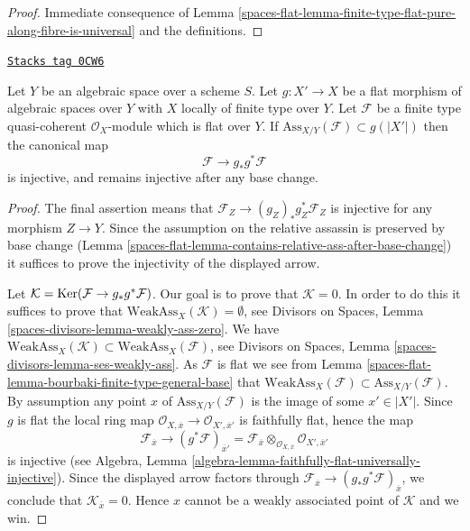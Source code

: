 \begin{proof}
Immediate consequence of
Lemma \ref{spaces-flat-lemma-finite-type-flat-pure-along-fibre-is-universal}
and the definitions.
\end{proof}

\begin{lemma}
\label{spaces-flat-lemma-universally-separating}
\href{https://stacks.math.columbia.edu/tag/0CW6}{\texttt{Stacks tag 0CW6}}

Let $Y$ be an algebraic space over a scheme $S$.
Let $g : X' \to X$ be a flat morphism of algebraic spaces over $Y$
with $X$ locally of finite type over $Y$.
Let $\mathcal{F}$ be a finite type quasi-coherent $\mathcal{O}_X$-module
which is flat over $Y$. If $\text{Ass}_{X/Y}(\mathcal{F}) \subset g(|X'|)$
then the canonical map
$$
\mathcal{F} \longrightarrow g_*g^*\mathcal{F}
$$
is injective, and remains injective after any base change.
\end{lemma}

\begin{proof}
The final assertion means that $\mathcal{F}_Z \to (g_Z)_*g_Z^*\mathcal{F}_Z$
is injective for any morphism $Z \to Y$. Since the assumption on
the relative assassin is preserved by base change
(Lemma \ref{spaces-flat-lemma-contains-relative-ass-after-base-change})
it suffices to prove the injectivity of the displayed arrow.

\medskip\noindent
Let $\mathcal{K} = \operatorname{Ker}(\mathcal{F} \to g_*g^*\mathcal{F})$.
Our goal is to prove that $\mathcal{K} = 0$.
In order to do this it suffices to prove that
$\text{WeakAss}_X(\mathcal{K}) = \emptyset$, see
Divisors on Spaces, Lemma \ref{spaces-divisors-lemma-weakly-ass-zero}.
We have
$\text{WeakAss}_X(\mathcal{K}) \subset \text{WeakAss}_X(\mathcal{F})$, see
Divisors on Spaces, Lemma \ref{spaces-divisors-lemma-ses-weakly-ass}.
As $\mathcal{F}$ is flat we see from
Lemma \ref{spaces-flat-lemma-bourbaki-finite-type-general-base}
that $\text{WeakAss}_X(\mathcal{F}) \subset \text{Ass}_{X/Y}(\mathcal{F})$.
By assumption any point $x$ of $\text{Ass}_{X/Y}(\mathcal{F})$
is the image of some $x' \in |X'|$. Since $g$ is flat the
local ring map
$\mathcal{O}_{X, \overline{x}} \to \mathcal{O}_{X', \overline{x}'}$
is faithfully flat, hence the map
$$
\mathcal{F}_{\overline{x}}
\longrightarrow
(g^*\mathcal{F})_{\overline{x}'} =
\mathcal{F}_{\overline{x}} \otimes_{\mathcal{O}_{X, \overline{x}}}
\mathcal{O}_{X', \overline{x}'}
$$
is injective (see
Algebra, Lemma \ref{algebra-lemma-faithfully-flat-universally-injective}).
Since the displayed arrow factors through
$\mathcal{F}_{\overline{x}} \to (g_*g^*\mathcal{F})_{\overline{x}}$,
we conclude that
$\mathcal{K}_{\overline{x}} = 0$. Hence $x$ cannot be a weakly associated
point of $\mathcal{K}$ and we win.
\end{proof}

